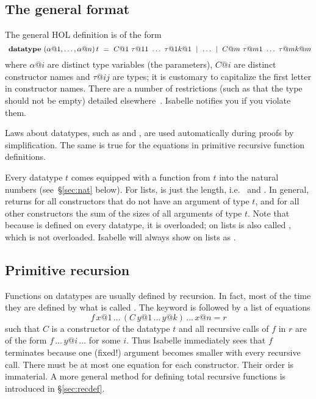 \subsection{The general format}
\label{sec:general-datatype}

The general HOL  definition is of the form
\[
\isacommand{datatype}~(\alpha@1, \dots, \alpha@n) \, t ~=~
C@1~\tau@{11}~\dots~\tau@{1k@1} ~\mid~ \dots ~\mid~
C@m~\tau@{m1}~\dots~\tau@{mk@m}
\]
where $\alpha@i$ are distinct type variables (the parameters), $C@i$ are distinct
constructor names and $\tau@{ij}$ are types; it is customary to capitalize
the first letter in constructor names. There are a number of
restrictions (such as that the type should not be empty) detailed
elsewhere~\cite{isabelle-HOL}. Isabelle notifies you if you violate them.

Laws about datatypes, such as  and
, are used automatically
during proofs by simplification.  The same is true for the equations in
primitive recursive function definitions.

Every datatype $t$ comes equipped with a  function from $t$ into
the natural numbers (see~{\S}\ref{sec:nat} below). For lists,  is
just the length, i.e.\  and .  In general,  returns  for all constructors
that do not have an argument of type $t$, and for all other constructors
 the sum of the sizes of all arguments of type $t$. Note that because
 is defined on every datatype, it is overloaded; on lists
 is also called , which is not overloaded.
Isabelle will always show  on lists as .


\subsection{Primitive recursion}

Functions on datatypes are usually defined by recursion. In fact, most of the
time they are defined by what is called .
The keyword  is followed by a list of
equations
\[ f \, x@1 \, \dots \, (C \, y@1 \, \dots \, y@k)\, \dots \, x@n = r \]
such that $C$ is a constructor of the datatype $t$ and all recursive calls of
$f$ in $r$ are of the form $f \, \dots \, y@i \, \dots$ for some $i$. Thus
Isabelle immediately sees that $f$ terminates because one (fixed!) argument
becomes smaller with every recursive call. There must be at most one equation
for each constructor.  Their order is immaterial.
A more general method for defining total recursive functions is introduced in
{\S}\ref{sec:recdef}.

